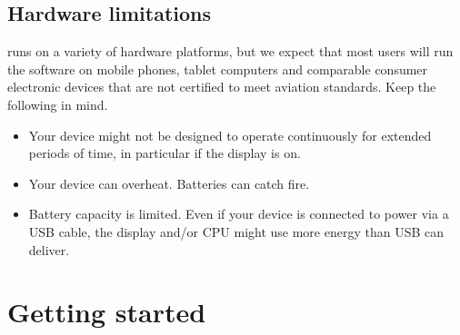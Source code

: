 \documentclass[letterpaper,10pt,english]{sphinxmanual}
\begin{document}
\section{Hardware limitations}
\label{\detokenize{01-intro/01-think:hardware-limitations}}
\sphinxAtStartPar
{} runs on a variety of hardware platforms, but we
expect that most users will run the software on mobile phones, tablet computers
and comparable consumer electronic devices that are not certified to meet
aviation standards.  Keep the following in mind.
\begin{itemize}
\item {} 
\sphinxAtStartPar
Your device might not be designed to operate continuously for extended periods
of time, in particular if the display is on.

\item {} 
\sphinxAtStartPar
Your device can overheat. Batteries can catch fire.

\item {} 
\sphinxAtStartPar
Battery capacity is limited.  Even if your device is connected to power via a
USB cable, the display and/or CPU might use more energy than USB can deliver.

\end{itemize}


\chapter{Getting started}
\label{\detokenize{01-intro/02-getting_started:getting-started}}\label{\detokenize{01-intro/02-getting_started::doc}}
\end{document}
